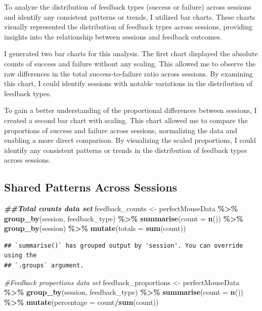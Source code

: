 \documentclass[
]{article}
\newenvironment{Shaded}{\begin{snugshade}}{\end{snugshade}}
\newcommand{\AttributeTok}[1]{\textcolor[rgb]{0.13,0.29,0.53}{#1}}
\newcommand{\CommentTok}[1]{\textcolor[rgb]{0.56,0.35,0.01}{\textit{#1}}}
\newcommand{\DocumentationTok}[1]{\textcolor[rgb]{0.56,0.35,0.01}{\textbf{\textit{#1}}}}
\newcommand{\FunctionTok}[1]{\textcolor[rgb]{0.13,0.29,0.53}{\textbf{#1}}}
\newcommand{\NormalTok}[1]{#1}
\newcommand{\OtherTok}[1]{\textcolor[rgb]{0.56,0.35,0.01}{#1}}
\newcommand{\SpecialCharTok}[1]{\textcolor[rgb]{0.81,0.36,0.00}{\textbf{#1}}}
\begin{document}
To analyze the distribution of feedback types (success or failure)
across sessions and identify any consistent patterns or trends, I
utilized bar charts. These charts visually represented the distribution
of feedback types across sessions, providing insights into the
relationship between sessions and feedback outcomes.

I generated two bar charts for this analysis. The first chart displayed
the absolute counts of success and failure without any scaling. This
allowed me to observe the raw differences in the total
success-to-failure ratio across sessions. By examining this chart, I
could identify sessions with notable variations in the distribution of
feedback types.

To gain a better understanding of the proportional differences between
sessions, I created a second bar chart with scaling. This chart allowed
me to compare the proportions of success and failure across sessions,
normalizing the data and enabling a more direct comparison. By
visualizing the scaled proportions, I could identify any consistent
patterns or trends in the distribution of feedback types across
sessions.

\subsection{Shared Patterns Across
Sessions}\label{shared-patterns-across-sessions}

\begin{Shaded}
\begin{Highlighting}[]
\DocumentationTok{\#\#Total counts data set}
\NormalTok{feedback\_counts }\OtherTok{\textless{}{-}}\NormalTok{ perfectMouseData }\SpecialCharTok{\%\textgreater{}\%}
  \FunctionTok{group\_by}\NormalTok{(session, feedback\_type) }\SpecialCharTok{\%\textgreater{}\%}
  \FunctionTok{summarise}\NormalTok{(}\AttributeTok{count =} \FunctionTok{n}\NormalTok{()) }\SpecialCharTok{\%\textgreater{}\%} \FunctionTok{group\_by}\NormalTok{(session) }\SpecialCharTok{\%\textgreater{}\%} \FunctionTok{mutate}\NormalTok{(}\AttributeTok{totals =} \FunctionTok{sum}\NormalTok{(count))}
\end{Highlighting}
\end{Shaded}

\begin{verbatim}
## `summarise()` has grouped output by 'session'. You can override using the
## `.groups` argument.
\end{verbatim}

\begin{Shaded}
\begin{Highlighting}[]
\CommentTok{\#Feedback proportions data set}
\NormalTok{feedback\_proportions }\OtherTok{\textless{}{-}}\NormalTok{ perfectMouseData }\SpecialCharTok{\%\textgreater{}\%}
  \FunctionTok{group\_by}\NormalTok{(session, feedback\_type) }\SpecialCharTok{\%\textgreater{}\%}
  \FunctionTok{summarise}\NormalTok{(}\AttributeTok{count =} \FunctionTok{n}\NormalTok{()) }\SpecialCharTok{\%\textgreater{}\%} \FunctionTok{mutate}\NormalTok{(}\AttributeTok{percentage =}\NormalTok{ count}\SpecialCharTok{/}\FunctionTok{sum}\NormalTok{(count))}
\end{Highlighting}
\end{Shaded}
\end{document}
